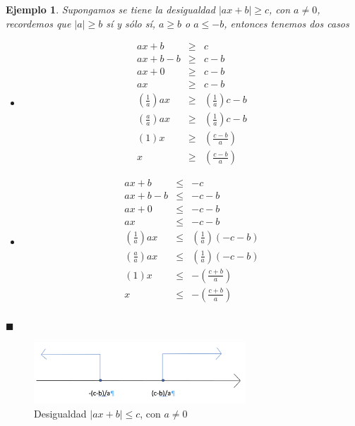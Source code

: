 \documentclass[]{book}
\newtheorem{Ejem}{Ejemplo}[chapter]
\begin{document}
\begin{Ejem}
Supongamos se tiene la desigualdad $|ax+b|\geq c$, con $a\neq0$, recordemos que $|a|\geq b$ sí y sólo sí, $a\geq b$ o $a\leq -b$, entonces tenemos dos casos

\begin{itemize}
\item[Caso 1:]
\begin{eqnarray*}
ax+b&\geq& c\\
ax+b-b&\geq& c-b\\
ax+0&\geq& c-b\\
ax&\geq& c-b\\
\left(\frac{1}{a}\right)ax&\geq&\left(\frac{1}{a}\right)c-b\\
\left(\frac{a}{a}\right)ax&\geq&\left(\frac{1}{a}\right)c-b\\
\left(1\right)x&\geq&\left(\frac{c-b}{a}\right)\\
x&\geq&\left(\frac{c-b}{a}\right)
\end{eqnarray*}


\item[Caso 2:]
\begin{eqnarray*}
ax+b&\leq& -c\\
ax+b-b&\leq& -c-b\\
ax+0&\leq& -c-b\\
ax&\leq& -c-b\\
\left(\frac{1}{a}\right)ax&\leq&\left(\frac{1}{a}\right)\left(-c-b\right)\\
\left(\frac{a}{a}\right)ax&\leq&\left(\frac{1}{a}\right)\left(-c-b\right)\\
\left(1\right)x&\leq&-\left(\frac{c+b}{a}\right)\\
x&\leq&-\left(\frac{c+b}{a}\right)\\
\end{eqnarray*}

\end{itemize}

\begin{flushright}
$\blacksquare$
\end{flushright}

\end{Ejem}

\begin{figure}
\centering
\includegraphics[width=3.12500in]{Desigualdad5.png}
\caption{Desigualdad \(|ax+b|\leq c\), con \(a\neq0\)}
\end{figure}
\end{document}
